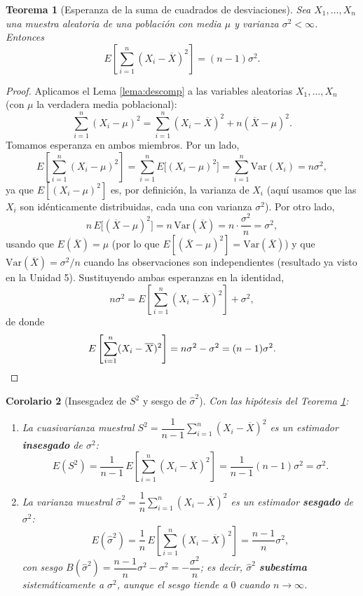 \documentclass[11pt,a4paper]{article}
\theoremstyle{plain}
\newtheorem{teorema}{Teorema}[section]
\newtheorem{corolario}[teorema]{Corolario}
\theoremstyle{definition}
\theoremstyle{remark}
\begin{document}
\begin{teorema}[Esperanza de la suma de cuadrados de desviaciones]\label{teo:sumacuad}
Sea $X_1,\dots,X_n$ una muestra aleatoria de una población con media $\mu$ y varianza $\sigma^2<\infty$. Entonces
\[
E\left[\sum_{i=1}^n (X_i-\overline X)^2\right] = (n-1)\sigma^2.
\]
\end{teorema}

\begin{proof}
Aplicamos el Lema \ref{lema:descomp} a las variables aleatorias $X_1,\dots,X_n$ (con $\mu$ la verdadera media poblacional):
\[
\sum_{i=1}^n (X_i-\mu)^2 = \sum_{i=1}^n (X_i-\overline X)^2 + n(\overline X-\mu)^2.
\]
Tomamos esperanza en ambos miembros. Por un lado,
\[
E\left[\sum_{i=1}^n (X_i-\mu)^2\right] = \sum_{i=1}^n E\big[(X_i-\mu)^2\big] = \sum_{i=1}^n \mathrm{Var}(X_i) = n\sigma^2,
\]
ya que $E[(X_i-\mu)^2]$ es, por definición, la varianza de $X_i$ (aquí usamos que las $X_i$ son idénticamente distribuidas, cada una con varianza $\sigma^2$). Por otro lado,
\[
n\, E\big[(\overline X-\mu)^2\big] = n\,\mathrm{Var}(\overline X) = n\cdot\frac{\sigma^2}{n} = \sigma^2,
\]
usando que $E(\overline X)=\mu$ (por lo que $E[(\overline X-\mu)^2]=\mathrm{Var}(\overline X)$) y que $\mathrm{Var}(\overline X)=\sigma^2/n$ cuando las observaciones son independientes (resultado ya visto en la Unidad 5). Sustituyendo ambas esperanzas en la identidad,
\[
n\sigma^2 = E\left[\sum_{i=1}^n (X_i-\overline X)^2\right] + \sigma^2,
\]
de donde
\[
E\left[\sum_{i=1}^n (X_i-\overline X)^2\right] = n\sigma^2-\sigma^2 = (n-1)\sigma^2. \qedhere
\]
\end{proof}

\begin{corolario}[Insesgadez de $S^2$ y sesgo de $\widehat\sigma^2$]\label{cor:s2}
Con las hipótesis del Teorema \ref{teo:sumacuad}:
\begin{enumerate}[label=(\alph*)]
\item La cuasivarianza muestral $S^2=\dfrac{1}{n-1}\sum_{i=1}^n (X_i-\overline X)^2$ es un estimador \textbf{insesgado} de $\sigma^2$:
\[
E(S^2) = \frac{1}{n-1}\,E\left[\sum_{i=1}^n(X_i-\overline X)^2\right] = \frac{1}{n-1}(n-1)\sigma^2 = \sigma^2.
\]
\item La varianza muestral $\widehat\sigma^2 = \dfrac1n\sum_{i=1}^n(X_i-\overline X)^2$ es un estimador \textbf{sesgado} de $\sigma^2$:
\[
E(\widehat\sigma^2) = \frac1n\,E\left[\sum_{i=1}^n(X_i-\overline X)^2\right] = \frac{n-1}{n}\sigma^2,
\]
con sesgo $B(\widehat\sigma^2) = \dfrac{n-1}{n}\sigma^2-\sigma^2 = -\dfrac{\sigma^2}{n}$; es decir, $\widehat\sigma^2$ \textbf{subestima} sistemáticamente a $\sigma^2$, aunque el sesgo tiende a $0$ cuando $n\to\infty$.
\end{enumerate}
\end{corolario}
\end{document}
